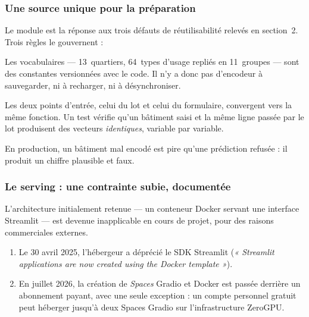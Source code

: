 \subsubsection{Une source unique pour la préparation}
\label{sec:source-unique}

Le module  est la réponse aux trois défauts de
réutilisabilité relevés en section~2. Trois règles le gouvernent :

\begin{description}[leftmargin=0em,style=nextline,itemsep=0.3em]
  \item[Aucun état appris n'est persisté.] Les vocabulaires — 13~quartiers,
        64~types d'usage repliés en 11~groupes — sont des constantes versionnées
        avec le code. Il n'y a donc pas d'encodeur à sauvegarder, ni à recharger,
        ni à désynchroniser.
  \item[Un seul chemin d'assemblage.] Les deux points d'entrée, celui du lot et
        celui du formulaire, convergent vers la même fonction. Un test vérifie
        qu'un bâtiment saisi et la même ligne passée par le lot produisent des
        vecteurs \emph{identiques}, variable par variable.
  \item[Une modalité inconnue lève une exception.] En production, un bâtiment mal
        encodé est pire qu'une prédiction refusée : il produit un chiffre
        plausible et faux.
\end{description}

\subsubsection{Le serving : une contrainte subie, documentée}

L'architecture initialement retenue — un conteneur Docker servant une interface
Streamlit — est devenue inapplicable en cours de projet, pour des raisons
commerciales externes.

\begin{enumerate}[leftmargin=1.6em,itemsep=0.25em]
  \item Le 30 avril 2025, l'hébergeur a déprécié le SDK Streamlit
        (\emph{« Streamlit applications are now created using the Docker template »}).
  \item En juillet 2026, la création de \emph{Spaces} Gradio et Docker est passée
        derrière un abonnement payant, avec une seule exception : un compte
        personnel gratuit peut héberger jusqu'à deux Spaces Gradio sur
        l'infrastructure ZeroGPU.
\end{enumerate}

